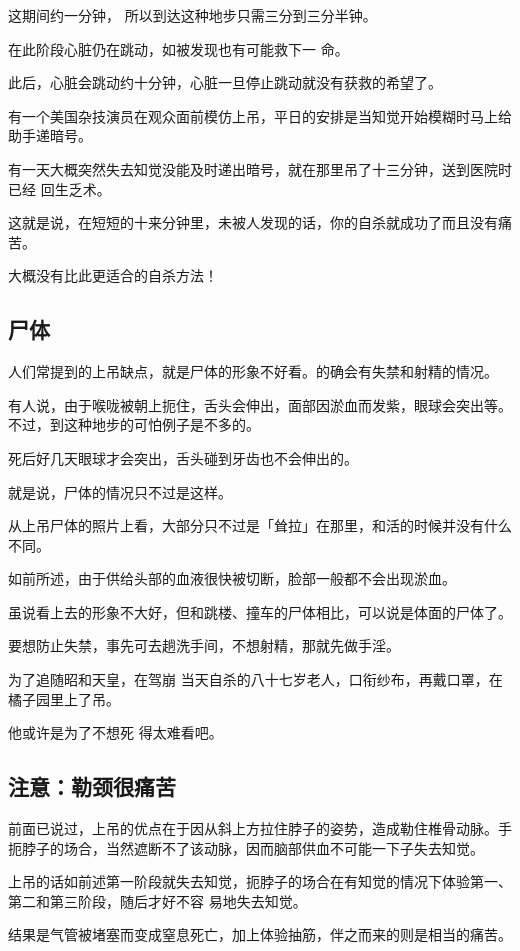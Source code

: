 \documentclass[UTF8]{ctexart}
\begin{document}
这期间约一分钟， 所以到达这种地步只需三分到三分半钟。

在此阶段心脏仍在跳动，如被发现也有可能救下一 命。

此后，心脏会跳动约十分钟，心脏一旦停止跳动就没有获救的希望了。

有一个美国杂技演员在观众面前模仿上吊，平日的安排是当知觉开始模糊时马上给助手递暗号。

有一天大概突然失去知觉没能及时递出暗号，就在那里吊了十三分钟，送到医院时已经 回生乏术。

这就是说，在短短的十来分钟里，未被人发现的话，你的自杀就成功了而且没有痛苦。

大概没有比此更适合的自杀方法！

\subsection{尸体}
 
人们常提到的上吊缺点，就是尸体的形象不好看。的确会有失禁和射精的情况。

有人说，由于喉咙被朝上扼住，舌头会伸出，面部因淤血而发紫，眼球会突出等。不过，到这种地步的可怕例子是不多的。

死后好几天眼球才会突出，舌头碰到牙齿也不会伸出的。

就是说，尸体的情况只不过是这样。

从上吊尸体的照片上看，大部分只不过是「耸拉」在那里，和活的时候并没有什么不同。

如前所述，由于供给头部的血液很快被切断，脸部一般都不会出现淤血。

虽说看上去的形象不大好，但和跳楼、撞车的尸体相比，可以说是体面的尸体了。

要想防止失禁，事先可去趟洗手间，不想射精，那就先做手淫。

为了追随昭和天皇，在驾崩 当天自杀的八十七岁老人，口衔纱布，再戴口罩，在橘子园里上了吊。

他或许是为了不想死 得太难看吧。

\subsection{注意：勒颈很痛苦}

前面已说过，上吊的优点在于因从斜上方拉住脖子的姿势，造成勒住椎骨动脉。手扼脖子的场合，当然遮断不了该动脉，因而脑部供血不可能一下子失去知觉。

上吊的话如前述第一阶段就失去知觉，扼脖子的场合在有知觉的情况下体验第一、第二和第三阶段，随后才好不容
易地失去知觉。

结果是气管被堵塞而变成窒息死亡，加上体验抽筋，伴之而来的则是相当的痛苦。
\end{document}

